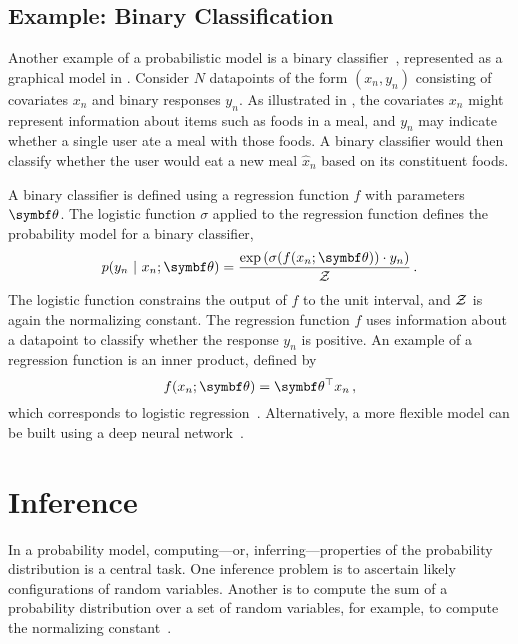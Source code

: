 
\subsection{Example: Binary Classification}

Another example of a probabilistic model is a binary classifier~\citep{bishop2006pattern}, represented as a graphical model in . Consider $N$ datapoints of the form $(x_n, y_n)$ consisting of covariates $x_n$ and binary responses $y_n$. As illustrated in , the covariates $x_n$ might represent information about items such as foods in a meal, and $y_n$ may indicate whether a single user ate a meal with those foods. A binary classifier would then classify whether the user would eat a new meal $\hat{x}_n$ based on its constituent foods.

A binary classifier is defined using a regression function $f$ with parameters $\mbtheta$. The logistic function $\sigma$ applied to the regression function defines the probability model for a binary classifier,
\begin{equation}
  p(y_n \mid x_n; \mbtheta) = \frac{\exp\left( \sigma(f(x_n; \mbtheta)) \cdot y_n\right)}{\cZ}\, .
  \label{eq:binary-classification}
\end{equation}
The logistic function constrains the output of $f$ to the unit interval, and $\mathcal{Z}$ is again the normalizing constant. The regression function $f$ uses information about a datapoint to classify whether the response $y_n$ is positive. An example of a regression function is an inner product, defined by
\begin{equation}
  f(x_n; \mbtheta) = \mbtheta^\top x_n\, ,
\end{equation}
which corresponds to logistic regression~\citep{bishop2006pattern}. Alternatively, a more flexible model can be built using a deep neural network~\citep{lecun2015deep}.

\section{Inference}
In a probability model, computing---or, inferring---properties of the probability distribution is a central task. One inference problem is to ascertain likely configurations of random variables. Another is to compute the sum of a probability distribution over a set of random variables, for example, to compute the normalizing constant~\citep{jordan2004graphical}.

